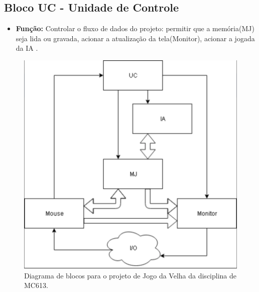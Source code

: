 \documentclass{article}
\begin{document}
    \subsection{Bloco UC - Unidade de Controle}
        \begin{itemize}
            \item \textbf{Função:} Controlar o fluxo de dados do projeto: permitir que a memória(MJ) seja lida ou gravada, acionar a atualização da tela(Monitor), acionar a jogada da IA .
        \end{itemize}

\begin{figure}[h!]
    \centering
    \includegraphics[scale=0.7]{diagrama.png}
    \caption{\label{fig:diagrama}Diagrama de blocos para o projeto de Jogo da Velha da disciplina de MC613.}
\end{figure}


\nocite{*}


\end{document}
